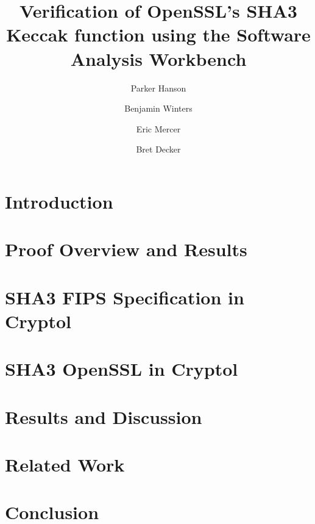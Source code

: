 \documentclass[runningheads]{llncs}
\begin{document}
%
\title{Verification of OpenSSL's SHA3 Keccak function using the Software Analysis Workbench}
%
%
\author{
  Parker Hanson \and
  Benjamin Winters \and
  Eric Mercer \and
  Bret Decker
}
%
%
%
\maketitle              %
%
\begin{abstract}

\end{abstract}

\section{Introduction}\label{sec:introduction}


% 

\section{Proof Overview and Results}\label{sec:proof}


\section{SHA3 FIPS Specification in Cryptol}\label{sec:fips}


\section{SHA3 OpenSSL in Cryptol}\label{sec:openssl}


\section{Results and Discussion}\label{sec:results}


\section{Related Work}\label{sec:related}


\section{Conclusion}\label{sec:conclusion}


%
%
%
%
%
%


%
\end{document}
